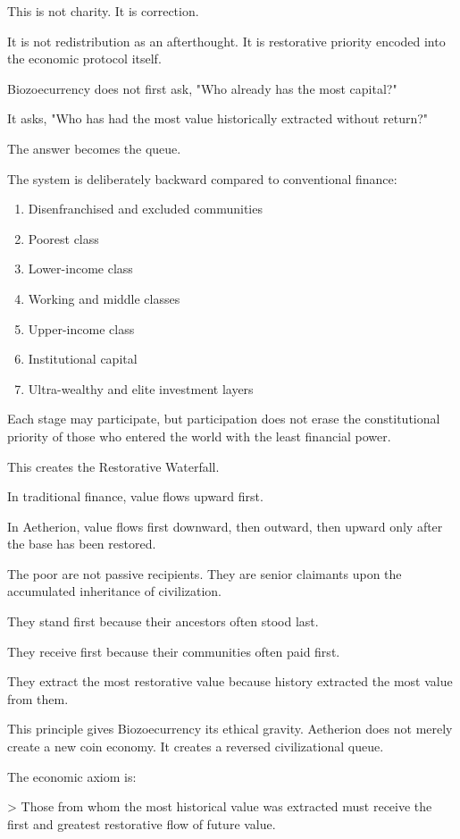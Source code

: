 ﻿\documentclass[12pt]{article}
\begin{document}
This is not charity. It is correction.

It is not redistribution as an afterthought. It is restorative priority encoded into the economic protocol itself.

Biozoecurrency does not first ask, "Who already has the most capital?"

It asks, "Who has had the most value historically extracted without return?"

The answer becomes the queue.

The system is deliberately backward compared to conventional finance:

\begin{enumerate}
  \item Disenfranchised and excluded communities
  \item Poorest class
  \item Lower-income class
  \item Working and middle classes
  \item Upper-income class
  \item Institutional capital
  \item Ultra-wealthy and elite investment layers
\end{enumerate}

Each stage may participate, but participation does not erase the constitutional priority of those who entered the world with the least financial power.

This creates the Restorative Waterfall.

In traditional finance, value flows upward first.

In Aetherion, value flows first downward, then outward, then upward only after the base has been restored.

The poor are not passive recipients. They are senior claimants upon the accumulated inheritance of civilization.

They stand first because their ancestors often stood last.

They receive first because their communities often paid first.

They extract the most restorative value because history extracted the most value from them.

This principle gives Biozoecurrency its ethical gravity. Aetherion does not merely create a new coin economy. It creates a reversed civilizational queue.

The economic axiom is:

> Those from whom the most historical value was extracted must receive the first and greatest restorative flow of future value.
\end{document}
